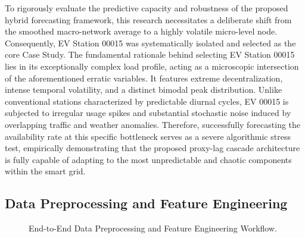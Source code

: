 \documentclass[pdflatex,sn-mathphys-num]{sn-jnl}%
\theoremstyle{thmstyleone}%
\theoremstyle{thmstyletwo}%
\theoremstyle{thmstylethree}%
\begin{document}
To rigorously evaluate the predictive capacity and robustness of the proposed hybrid forecasting framework, this research necessitates a deliberate shift from the smoothed macro-network average to a highly volatile micro-level node. Consequently, EV Station 00015 was systematically isolated and selected as the core Case Study. The fundamental rationale behind selecting EV Station 00015 lies in its exceptionally complex load profile, acting as a microscopic intersection of the aforementioned erratic variables. It features extreme decentralization, intense temporal volatility, and a distinct bimodal peak distribution. Unlike conventional stations characterized by predictable diurnal cycles, EV 00015 is subjected to irregular usage spikes and substantial stochastic noise induced by overlapping traffic and weather anomalies. Therefore, successfully forecasting the availability rate at this specific bottleneck serves as a severe algorithmic stress test, empirically demonstrating that the proposed proxy-lag cascade architecture is fully capable of adapting to the most unpredictable and chaotic components within the smart grid.

\subsection{Data Preprocessing and Feature Engineering}\label{subsec2_1}

\begin{figure}[htbp]
\centering
{}
\caption{End-to-End Data Preprocessing and Feature Engineering Workflow.}\label{fig:preprocessing}
\end{figure}
\end{document}
